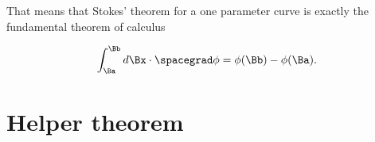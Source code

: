That means that Stokes' theorem for a one parameter curve is exactly the fundamental theorem of calculus

\begin{dmath}\label{eqn:stokesTheoremCore:80}
\int_{\Ba}^{\Bb} d\Bx \cdot \spacegrad \phi = \phi(\Bb) - \phi(\Ba).
\end{dmath}

\section{Helper theorem}


